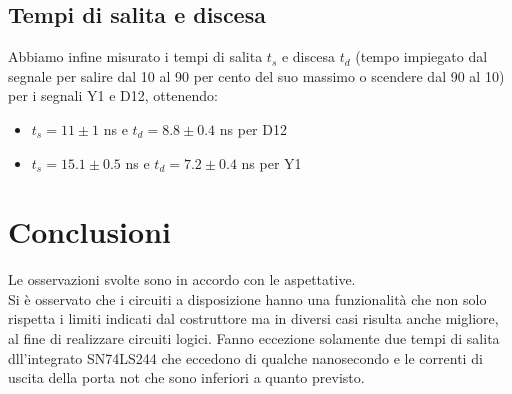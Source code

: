 \subsection{Tempi di salita e discesa}
Abbiamo infine misurato i tempi di salita $t_s$ e discesa $t_d$ (tempo impiegato dal segnale per salire dal 10 al 90 per cento del suo massimo o scendere dal 90 al 10) per i segnali Y1 e D12, ottenendo:
\begin{itemize}
\item $t_s = 11 \pm 1$ ns e $t_d = 8.8 \pm 0.4$ ns per D12
\item $t_s = 15.1 \pm 0.5$ ns e $t_d = 7.2 \pm 0.4$ ns per Y1
\end{itemize}
\section{Conclusioni}
Le osservazioni svolte sono in accordo con le aspettative.\\
Si è osservato che i circuiti a disposizione hanno una funzionalità che non solo rispetta i limiti indicati dal costruttore ma in diversi casi risulta anche migliore, al fine di realizzare circuiti logici. Fanno eccezione solamente due tempi di salita dll'integrato SN74LS244 che eccedono di qualche nanosecondo e le correnti di uscita della porta not che sono inferiori a quanto previsto.